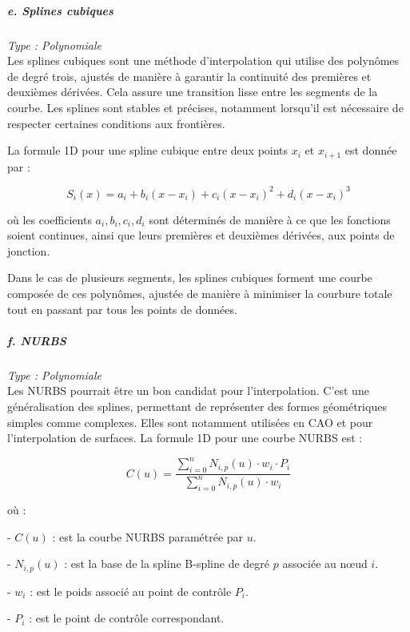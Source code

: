 \subparagraph{e. Splines cubiques \cite{gordont1971}}
\textit{Type : Polynomiale} \\
Les splines cubiques sont une méthode d'interpolation qui utilise des polynômes de degré trois, ajustés de manière à garantir la continuité des premières et deuxièmes dérivées. Cela assure une transition lisse entre les segments de la courbe. Les splines sont stables et précises, notamment lorsqu'il est nécessaire de respecter certaines conditions aux frontières.

La formule 1D pour une spline cubique entre deux points \( x_i \) et \( x_{i+1} \) est donnée par :

\begin{equation}
    S_i(x) = a_i + b_i(x - x_i) + c_i(x - x_i)^2 + d_i(x - x_i)^3
\end{equation}

où les coefficients \( a_i, b_i, c_i, d_i \) sont déterminés de manière à ce que les fonctions soient continues, ainsi que leurs premières et deuxièmes dérivées, aux points de jonction.

Dans le cas de plusieurs segments, les splines cubiques forment une courbe composée de ces polynômes, ajustée de manière à minimiser la courbure totale tout en passant par tous les points de données.


\subparagraph{f. NURBS \cite{piegl1995nurbs, surface}}
\textit{Type : Polynomiale} \\
Les \ac{NURBS} pourrait être un bon candidat pour l'interpolation. C'est une généralisation des splines, permettant de représenter des formes géométriques simples comme complexes. Elles sont notamment utilisées en CAO et pour l'interpolation de surfaces.
La formule 1D pour une courbe NURBS est :

\begin{equation}
    C(u) = \frac{\sum_{i=0}^{n} N_{i,p}(u) \cdot w_i \cdot P_i}{\sum_{i=0}^{n} N_{i,p}(u) \cdot w_i}
\end{equation}

où :

- \( C(u) \) : est la courbe NURBS paramétrée par \( u \).

- \( N_{i,p}(u) \) : est la base de la spline B-spline de degré \( p \) associée au nœud \( i \).

- \( w_i \) : est le poids associé au point de contrôle \( P_i \).

- \( P_i \) : est le point de contrôle correspondant.

